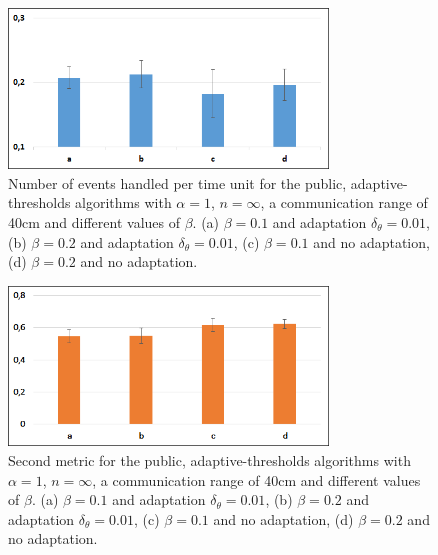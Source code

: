 	\begin{figure}[thpb]
      \centering
      \includegraphics[width=8.5cm]{Pictures/PubMetric1.png}
      \caption{Number of events handled per time unit for the public, adaptive-thresholds algorithms with $\alpha=1$, $n=\infty$, a communication range of 40cm and different values of $\beta$. (a) $\beta=0.1$ and adaptation $\delta_{\theta}=0.01$, (b) $\beta=0.2$ and adaptation $\delta_{\theta}=0.01$, (c) $\beta=0.1$ and no adaptation, (d) $\beta=0.2$ and no adaptation.}
      \label{figure7}
   \end{figure}
	\begin{figure}[thpb]
      \centering
      \includegraphics[width=8.5cm]{Pictures/PubMetric2.png}
      \caption{Second metric for the public, adaptive-thresholds algorithms with $\alpha=1$, $n=\infty$, a communication range of 40cm and different values of $\beta$. (a) $\beta=0.1$ and adaptation $\delta_{\theta}=0.01$, (b) $\beta=0.2$ and adaptation $\delta_{\theta}=0.01$, (c) $\beta=0.1$ and no adaptation, (d) $\beta=0.2$ and no adaptation.}
      \label{figure8}
   \end{figure}
